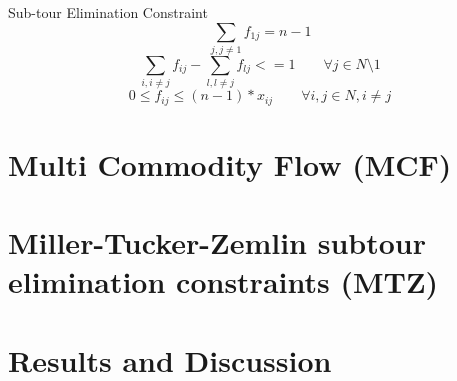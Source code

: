 \documentclass[a4paper]{article}
\begin{document}
Sub-tour Elimination Constraint
\begin{equation}
\sum_{j, j\neq 1} f_{1j} = n - 1
\end{equation}
\begin{equation}
\sum_{i, i\neq j} f_{ij} - \sum_{l, l\neq j} f_{lj} <= 1 \quad \quad \forall j \in N \setminus {1}
\end{equation}
\begin{equation}
0 \leq f_{ij} \leq (n - 1) * x_{ij} \quad \quad \forall i,j \in N, i \neq j
\end{equation}


\section*{Multi Commodity Flow (MCF)}

\section*{Miller-Tucker-Zemlin subtour elimination constraints (MTZ)}

\section*{Results and Discussion}
\end{document}
